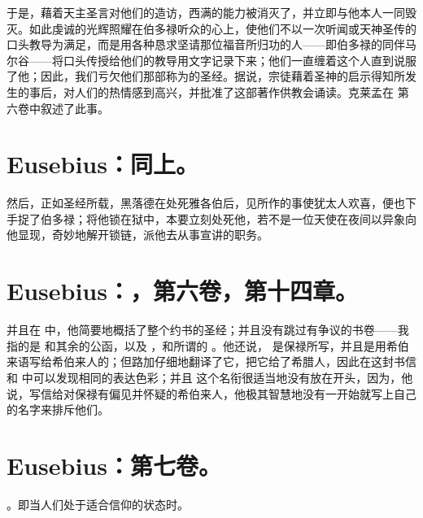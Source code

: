 于是，藉着天主圣言对他们的造访，西满的能力被消灭了，并立即与他本人一同毁灭。如此虔诚的光辉照耀在伯多禄听众的心上，使他们不以一次听闻或天神圣传的口头教导为满足，而是用各种恳求坚请那位福音所归功的人——即伯多禄的同伴马尔谷——将口头传授给他们的教导用文字记录下来；他们一直缠着这个人直到说服了他；因此，我们亏欠他们那部称为的圣经。据说，宗徒藉着圣神的启示得知所发生的事后，对人们的热情感到高兴，并批准了这部著作供教会诵读。克莱孟在  第六卷中叙述了此事。\par


\section{Eusebius：同上。}

然后，正如圣经所载，黑落德在处死雅各伯后，见所作的事使犹太人欢喜，便也下手捉了伯多禄；将他锁在狱中，本要立刻处死他，若不是一位天使在夜间以异象向他显现，奇妙地解开锁链，派他去从事宣讲的职务。\par


\section{Eusebius：，第六卷，第十四章。}

并且在  中，他简要地概括了整个约书的圣经；并且没有跳过有争议的书卷——我指的是  和其余的公函，以及 ，和所谓的 。他还说， 是保禄所写，并且是用希伯来语写给希伯来人的；但路加仔细地翻译了它，把它给了希腊人，因此在这封书信和  中可以发现相同的表达色彩；并且  这个名衔很适当地没有放在开头，因为，他说，写信给对保禄有偏见并怀疑的希伯来人，他极其智慧地没有一开始就写上自己的名字来排斥他们。\par


\section{Eusebius：第七卷。}

。即当人们处于适合信仰的状态时。\par

